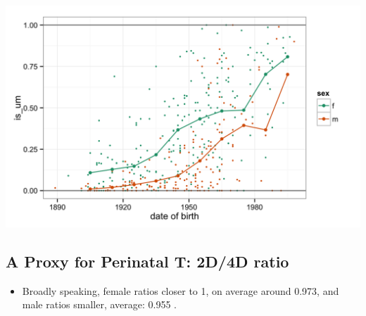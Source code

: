 \documentclass[a0,portrait]{a0poster}
\begin{document}
\begin{multicols}{2}
\begin{minipage}[b]{0.6\linewidth}
\begin{center}\vspace{1cm}
\includegraphics[width=.85\linewidth]{um.png}
\end{center}
\end{minipage}
\begin{minipage}[b]{0.3\linewidth}
\begin{center}
\end{center}
\end{minipage}

\subsection*{A Proxy for Perinatal T: 2D/4D ratio}






\begin{multicols}{2}

\begin{itemize}
	\item Broadly speaking, female ratios closer to 1, on average around 0.973, and male ratios smaller, average: 0.955 \citep[][107]{balthazart2011}.
	

\end{itemize}
\end{multicols}
\end{multicols}
\end{document}
